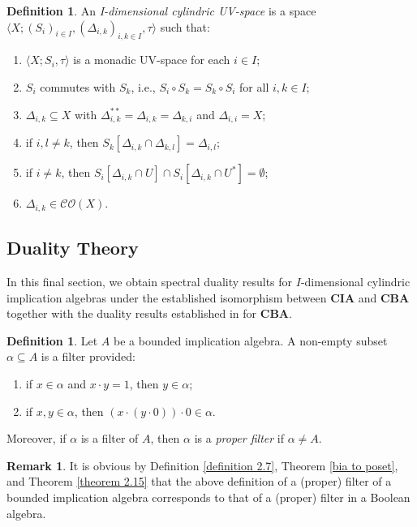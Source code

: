\documentclass[reqno]{amsart}
\theoremstyle{plain}
\theoremstyle{definition}
\newtheorem{definition}[theorem]{Definition}
\newtheorem{remark}[theorem]{Remark}
\begin{document}
\begin{definition}\label{cylindric uv space}
     An \emph{I-dimensional cylindric UV-space} is a space $\langle X;(S_i)_{i\in I},(\Delta_{i,k})_{i,k\in I},\tau\rangle$ such that: 
    \begin{enumerate}
        \item $\langle X;S_i,\tau\rangle$ is a monadic UV-space for each $i\in I$; 
      \item $S_i$ commutes with $S_k$, i.e., $S_i\circ S_k=S_k\circ S_i$ for all $i,k\in I$; 
        \item $\Delta_{i,k}\subseteq X$ with $\Delta^{**}_{i,k}=\Delta_{i,k}=\Delta_{k,i}$ and $\Delta_{i,i}=X$;
        \item if $i,l\not=k$, then $S_k[\Delta_{i,k}\cap \Delta_{k,l}]=\Delta_{i,l}$;
        \item if $i\not=k$, then $S_i[\Delta_{i,k}\cap U]\cap S_i[\Delta_{i,k}\cap U^*]=\emptyset$;   
        \item $\Delta_{i,k}\in\mathcal{CO}(X)$. 
    \end{enumerate}
\end{definition}

 \subsection{Duality Theory} In this final section, we obtain spectral duality results for $I$-dimensional cylindric implication algebras under the established isomorphism between $\mathbf{CIA}$ and $\mathbf{CBA}$ together with the duality results established in \cite{mcdonald2} for $\mathbf{CBA}$.  
\begin{definition}\label{filters}
    Let $A$ be a bounded implication algebra. A non-empty subset $\alpha\subseteq A$ is a filter provided: 
    \begin{enumerate}
        \item if $x\in\alpha$ and $x\cdot y=1$, then $y\in\alpha$; 
        \item if $x,y\in\alpha$, then $(x\cdot(y\cdot 0))\cdot 0\in\alpha$. 
    \end{enumerate}
    Moreover, if $\alpha$ is a filter of $A$, then $\alpha$ is a \emph{proper filter} if $\alpha\not=A$. 
\end{definition}
\begin{remark}
    It is obvious by Definition \ref{definition 2.7}, Theorem \ref{bia to poset}, and Theorem \ref{theorem 2.15} that the above definition of a (proper) filter of a bounded implication algebra corresponds to that of a (proper) filter in a Boolean algebra. 
\end{remark}
\end{document}
